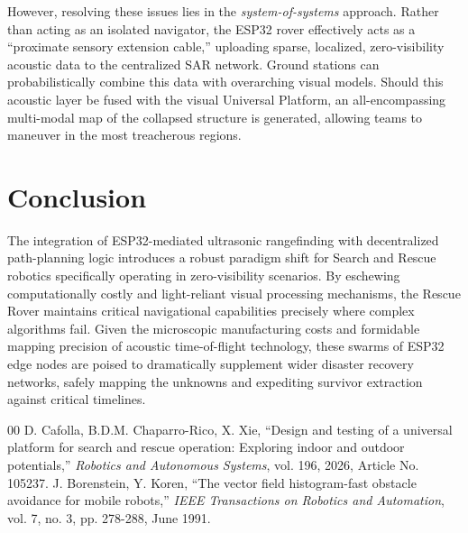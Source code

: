 \documentclass[conference]{IEEEtran}
\begin{document}
However, resolving these issues lies in the \textit{system-of-systems} approach. Rather than acting as an isolated navigator, the ESP32 rover effectively acts as a ``proximate sensory extension cable,'' uploading sparse, localized, zero-visibility acoustic data to the centralized SAR network. Ground stations can probabilistically combine this data with overarching visual models. Should this acoustic layer be fused with the visual Universal Platform, an all-encompassing multi-modal map of the collapsed structure is generated, allowing teams to maneuver in the most treacherous regions.

\section{Conclusion}
The integration of ESP32-mediated ultrasonic rangefinding with decentralized path-planning logic introduces a robust paradigm shift for Search and Rescue robotics specifically operating in zero-visibility scenarios. By eschewing computationally costly and light-reliant visual processing mechanisms, the Rescue Rover maintains critical navigational capabilities precisely where complex algorithms fail. Given the microscopic manufacturing costs and formidable mapping precision of acoustic time-of-flight technology, these swarms of ESP32 edge nodes are poised to dramatically supplement wider disaster recovery networks, safely mapping the unknowns and expediting survivor extraction against critical timelines.

\begin{thebibliography}{00}
 D. Cafolla, B.D.M. Chaparro-Rico, X. Xie, ``Design and testing of a universal platform for search and rescue operation: Exploring indoor and outdoor potentials,'' \textit{Robotics and Autonomous Systems}, vol. 196, 2026, Article No. 105237.
 J. Borenstein, Y. Koren, ``The vector field histogram-fast obstacle avoidance for mobile robots,'' \textit{IEEE Transactions on Robotics and Automation}, vol. 7, no. 3, pp. 278-288, June 1991.
\end{thebibliography}
\end{document}
